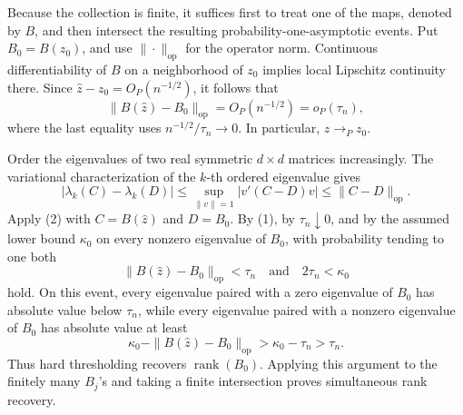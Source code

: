 Because the collection is finite, it suffices first to treat one of the maps, denoted by \(B\), and then intersect the resulting probability-one-asymptotic events.  Put \(B_0=B(z_0)\), and use \(\|\cdot\|_{\mathrm{op}}\) for the operator norm.  Continuous differentiability of \(B\) on a neighborhood of \(z_0\) implies local Lipschitz continuity there.  Since \(\widehat z-z_0=O_P(n^{-1/2})\), it follows that
\[
 \|B(\widehat z)-B_0\|_{\mathrm{op}}
 =O_P(n^{-1/2})=o_P(\tau_n),
 \tag{1}
\]
where the last equality uses \(n^{-1/2}/\tau_n\to0\).  In particular, \(\widehat z\to_P z_0\).

Order the eigenvalues of two real symmetric \(d\times d\) matrices increasingly.  The variational characterization of the \(k\)-th ordered eigenvalue gives
\[
 \bigl|\lambda_k(C)-\lambda_k(D)\bigr|
 \leq \sup_{\|v\|=1}\bigl|v'(C-D)v\bigr|
 \leq \|C-D\|_{\mathrm{op}}.
 \tag{2}
\]
Apply (2) with \(C=B(\widehat z)\) and \(D=B_0\).  By (1), by \(\tau_n\downarrow0\), and by the assumed lower bound \(\kappa_0\) on every nonzero eigenvalue of \(B_0\), with probability tending to one both
\[
 \|B(\widehat z)-B_0\|_{\mathrm{op}}<\tau_n
 \quad\text{and}\quad
 2\tau_n<\kappa_0
 \tag{3}
\]
hold.  On this event, every eigenvalue paired with a zero eigenvalue of \(B_0\) has absolute value below \(\tau_n\), while every eigenvalue paired with a nonzero eigenvalue of \(B_0\) has absolute value at least
\[
 \kappa_0-\|B(\widehat z)-B_0\|_{\mathrm{op}}
 >\kappa_0-\tau_n>\tau_n.
 \tag{4}
\]
Thus hard thresholding recovers \(\operatorname{rank}(B_0)\).  Applying this argument to the finitely many \(B_j\)'s and taking a finite intersection proves simultaneous rank recovery.

